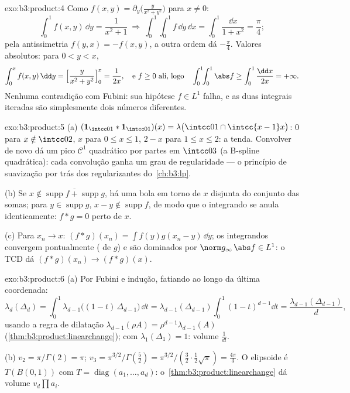 \begin{solution}{exo:b3:product:4}
Como $f(x,y) = \partial_y\bigl(\frac{y}{x^2+y^2}\bigr)$ para
$x \ne 0$:
\[
\int_0^1 f(x, y)\,\dd y = \frac{1}{x^2 + 1}
\ \Longrightarrow\
\int_0^1\!\!\int_0^1 f\,\dd y\,\dd x =
\int_0^1\frac{\dd x}{1 + x^2} = \frac\pi4 ;
\]
pela antissimetria $f(y,x) = -f(x,y)$, a outra ordem dá
$-\frac\pi4$. Valores absolutos: para $0 < y < x$,
\[
\int_0^x f(x,y)\,\dd y = \Bigl[\frac{y}{x^2 +
y^2}\Bigr]_0^x = \frac1{2x},
\quad\text{e } f \geq 0 \text{ ali, logo}\quad
\int_0^1\!\!\int_0^1\abs f \geq \int_0^1\frac{\dd x}{2x} =
+\infty .
\]
Nenhuma contradição com Fubini: sua hipótese $f \in L^1$
falha, e as duas integrais iteradas são simplesmente dois números
diferentes.
\end{solution}

\begin{solution}{exo:b3:product:5}
(a) $(\mathbf 1_{\intcc01}*\mathbf 1_{\intcc01})(x) =
\lambda\bigl(\intcc01\cap\intcc{x-1}x\bigr)$: $0$ para $x
\notin \intcc02$, $x$ para $0 \leq x \leq 1$, $2 - x$ para $1
\leq x \leq 2$: a tenda. Convolver de novo dá um pico $\mathcal
C^1$ quadrático por partes em $\intcc03$ (a B-spline
quadrática): cada convolução ganha um grau de regularidade ---
o princípio de suavização por trás dos regularizantes do~\cref{ch:b3:lp}.

(b) Se $x \notin \overline{\operatorname{supp}f +
\operatorname{supp}g}$, há uma bola em torno de $x$ disjunta
do conjunto das somas; para $y \in \operatorname{supp}g$, $x - y
\notin\operatorname{supp}f$, de modo que o integrando se anula
identicamente: $f * g = 0$ perto de $x$.

(c) Para $x_n \to x$: $(f*g)(x_n) = \int
f(y)g(x_n - y)\,\dd y$; os integrandos convergem pontualmente
( de $g$) e são dominados por $\norm
g_\infty\,\abs f \in L^1$: o TCD dá $(f*g)(x_n) \to (f*g)(x)$.
\end{solution}

\begin{solution}{exo:b3:product:6}
(a) Por Fubini e indução, fatiando ao longo da última
coordenada:
\[
\lambda_d(\Delta_d) = \int_0^1
\lambda_{d-1}\bigl((1 - t)\,\Delta_{d-1}\bigr)\,\dd t
= \lambda_{d-1}(\Delta_{d-1})\int_0^1(1 - t)^{d-1}\dd t
= \frac{\lambda_{d-1}(\Delta_{d-1})}{d},
\]
usando a regra de dilatação $\lambda_{d-1}(\rho A) =
\rho^{d-1}\lambda_{d-1}(A)$
(\cref{thm:b3:product:linearchange}); com
$\lambda_1(\Delta_1) = 1$: volume $\frac1{d!}$.

(b) $v_2 = \pi/\Gamma(2) = \pi$; $v_3 =
\pi^{3/2}/\Gamma(\frac52) = \pi^{3/2}/(\frac32\cdot\frac12
\sqrt\pi) = \frac{4\pi}3$. O elipsoide é $T(B(0,1))$ com
$T = \operatorname{diag}(a_1, \dots, a_d)$:
o~\cref{thm:b3:product:linearchange} dá volume
$v_d\prod a_i$.
\end{solution}

